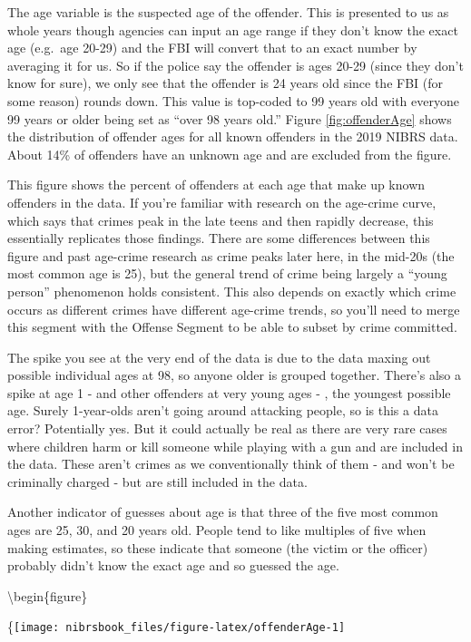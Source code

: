 \documentclass[
  12pt,
  openany]{book}
\begin{document}
The age variable is the suspected age of the offender. This is presented to us as whole years though agencies can input an age range if they don't know the exact age (e.g.~age 20-29) and the FBI will convert that to an exact number by averaging it for us. So if the police say the offender is ages 20-29 (since they don't know for sure), we only see that the offender is 24 years old since the FBI (for some reason) rounds down. This value is top-coded to 99 years old with everyone 99 years or older being set as ``over 98 years old.'' Figure \ref{fig:offenderAge} shows the distribution of offender ages for all known offenders in the 2019 NIBRS data. About 14\% of offenders have an unknown age and are excluded from the figure.

This figure shows the percent of offenders at each age that make up known offenders in the data. If you're familiar with research on the age-crime curve, which says that crimes peak in the late teens and then rapidly decrease, this essentially replicates those findings. There are some differences between this figure and past age-crime research as crime peaks later here, in the mid-20s (the most common age is 25), but the general trend of crime being largely a ``young person'' phenomenon holds consistent. This also depends on exactly which crime occurs as different crimes have different age-crime trends, so you'll need to merge this segment with the Offense Segment to be able to subset by crime committed.

The spike you see at the very end of the data is due to the data maxing out possible individual ages at 98, so anyone older is grouped together. There's also a spike at age 1 - and other offenders at very young ages - , the youngest possible age. Surely 1-year-olds aren't going around attacking people, so is this a data error? Potentially yes. But it could actually be real as there are very rare cases where children harm or kill someone while playing with a gun and are included in the data. These aren't crimes as we conventionally think of them - and won't be criminally charged - but are still included in the data.

Another indicator of guesses about age is that three of the five most common ages are 25, 30, and 20 years old. People tend to like multiples of five when making estimates, so these indicate that someone (the victim or the officer) probably didn't know the exact age and so guessed the age.

\textbackslash begin\{figure\}

\{\centering \texttt{[image: nibrsbook\_files/figure-latex/offenderAge-1]}
\end{document}
